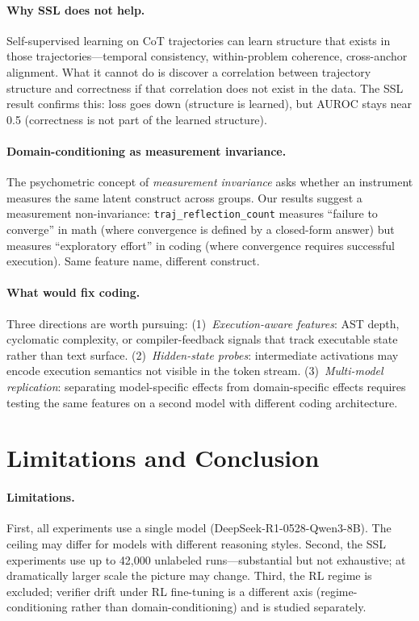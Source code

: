 \documentclass[10pt,twocolumn]{article}
\begin{document}
\paragraph{Why SSL does not help.} Self-supervised learning on CoT trajectories can learn structure that exists in those trajectories---temporal consistency, within-problem coherence, cross-anchor alignment. What it cannot do is discover a correlation between trajectory structure and correctness if that correlation does not exist in the data. The SSL result confirms this: loss goes down (structure is learned), but AUROC stays near 0.5 (correctness is not part of the learned structure).

\paragraph{Domain-conditioning as measurement invariance.} The psychometric concept of \emph{measurement invariance} \citep{vandenberg2000review} asks whether an instrument measures the same latent construct across groups. Our results suggest a measurement non-invariance: \texttt{traj\_reflection\_count} measures ``failure to converge'' in math (where convergence is defined by a closed-form answer) but measures ``exploratory effort'' in coding (where convergence requires successful execution). Same feature name, different construct.

\paragraph{What would fix coding.} Three directions are worth pursuing: (1)~\emph{Execution-aware features}: AST depth, cyclomatic complexity, or compiler-feedback signals that track executable state rather than text surface. (2)~\emph{Hidden-state probes}: intermediate activations may encode execution semantics not visible in the token stream. (3)~\emph{Multi-model replication}: separating model-specific effects from domain-specific effects requires testing the same features on a second model with different coding architecture.

\section{Limitations and Conclusion}
\label{sec:limits}

\paragraph{Limitations.} First, all experiments use a single model (DeepSeek-R1-0528-Qwen3-8B). The ceiling may differ for models with different reasoning styles. Second, the SSL experiments use up to 42,000 unlabeled runs---substantial but not exhaustive; at dramatically larger scale the picture may change. Third, the RL regime is excluded; verifier drift under RL fine-tuning is a different axis (regime-conditioning rather than domain-conditioning) and is studied separately.
\end{document}
